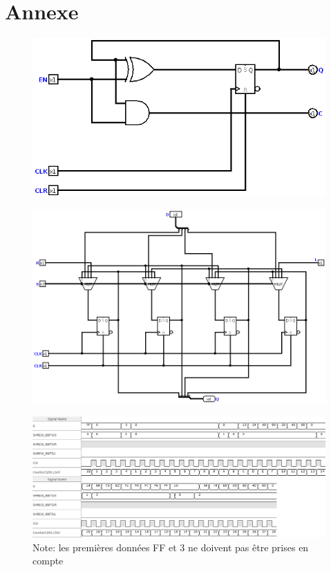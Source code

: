 \documentclass[a4paper]{article} %
\begin{document}
\section{Annexe}


\begin{figure}[H]
\centering
    \includegraphics[width=.8\textwidth]{src/COUNT_BASE.png}
    \label{fig:countBase}
\end{figure}

\begin{figure}[H]
\centering
    \includegraphics[width=.8\textwidth]{src/SHREGI_4BITS.png}
    \label{fig:shregi4}
\end{figure}

\begin{figure}[H]
\centering
    \includegraphics[width=1\textwidth]{src/chrono_SHREG_8BITS.png}
    \label{fig:chrono_shregi8}
    Note: les premières données FF et 3 ne doivent pas être prises en compte
\end{figure}
\end{document}
